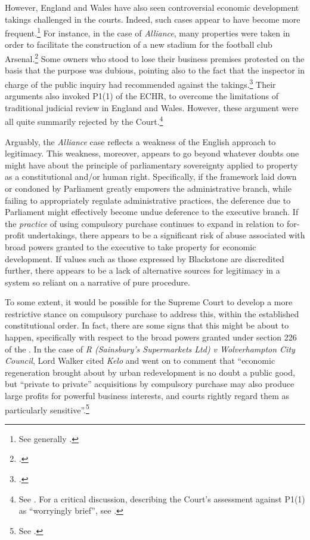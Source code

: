 However, England and Wales have also seen controversial economic development takings challenged in the courts. Indeed, such cases appear to have become more frequent.\footnote{See generally \cite{gray11}.} For instance, in the case of {\it Alliance}, many properties were taken in order to facilitate the construction of a new stadium for the football club Arsenal.\footcite{alliance06} Some owners who stood to lose their business premises protested on the basis that the purpose was dubious, pointing also to the fact that the inspector in charge of the public inquiry had recommended against the takings.\footcite[6-7]{alliance06} Their arguments also invoked P1(1) of the ECHR, to overcome the limitations of traditional judicial review in England and Wales. However, these argument were all quite summarily rejected by the Court.\footnote{See \cite[6-7]{alliance06}. For a critical discussion, describing the Court's assessment against P1(1) as ``worryingly brief'', see \cite[26]{gray11}.}

Arguably, the {\it Alliance} case reflects a weakness of the English approach to legitimacy. This weakness, moreover, appears to go beyond whatever doubts one might have about the principle of parliamentary sovereignty applied to property as a constitutional and/or human right. Specifically, if the framework laid down or condoned by Parliament greatly empowers the administrative branch, while failing to appropriately regulate administrative practices, the deference due to Parliament might effectively become undue deference to the executive branch. If the {\it practice} of using compulsory purchase continues to expand in relation to for-profit undertakings, there appears to be a significant risk of abuse associated with broad powers granted to the executive to take property for economic development. If values such as those expressed by Blackstone are discredited further, there appears to be a lack of alternative sources for legitimacy in a system so reliant on a narrative of pure procedure.

To some extent, it would be possible for the Supreme Court to develop a more restrictive stance on compulsory purchase to address this, within the established constitutional order. In fact, there are some signs that this might be about to happen, specifically with respect to the broad powers granted under section 226 of the \cite{tcpa90}. In the case of {\it R (Sainsbury's Supermarkets Ltd) v Wolverhampton City Council}, Lord Walker cited {\it Kelo} and went on to comment that ``economic regeneration brought about by urban redevelopment is no doubt a public good, but ``private to private'' acquisitions by compulsory purchase may also produce large profits for powerful business interests, and courts rightly regard them as particularly sensitive''.\footnote{See \cite[82]{sainsbury10}.}

